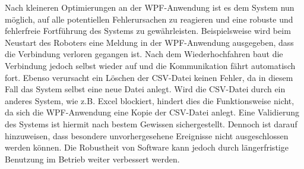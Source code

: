 \documentclass[ a4paper,
                oneside,
                toc=bibliography,
                toc=listof
                ]{scrbook}
\begin{document}
   	Nach kleineren Optimierungen an der WPF-Anwendung ist es dem System nun möglich, auf alle potentiellen Fehlerursachen zu reagieren und eine robuste und fehlerfreie Fortführung des Systems zu gewährleisten. Beispielsweise wird beim Neustart des Roboters eine Meldung in der WPF-Anwendung ausgegeben, dass die Verbindung verloren gegangen ist. Nach dem Wiederhochfahren baut die Verbindung jedoch selbst wieder auf und die Kommunikation fährt automatisch fort. Ebenso verursacht ein Löschen der CSV-Datei keinen Fehler, da in diesem Fall das System selbst eine neue Datei anlegt. Wird die CSV-Datei durch ein anderes System, wie z.B. Excel blockiert, hindert dies die Funktionsweise nicht, da sich die WPF-Anwendung eine Kopie der CSV-Datei anlegt. Eine Validierung des Systems ist hiermit nach bestem Gewissen sichergestellt. Dennoch ist darauf hinzuweisen, dass besondere unvorhergesehene Ereignisse nicht ausgeschlossen werden können. Die Robustheit von Software kann jedoch durch längerfristige Benutzung im Betrieb weiter verbessert werden. 
\end{document}
